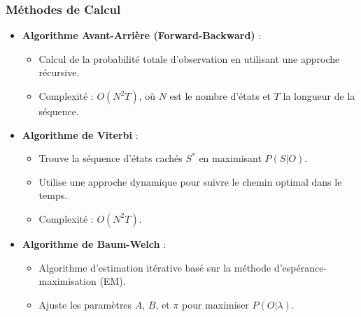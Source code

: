 \documentclass[a4paper,12pt,oneside]{report}	%
\begin{document}
            \subsubsection{Méthodes de Calcul}
                \begin{itemize}
                    \item \textbf{Algorithme Avant-Arrière (Forward-Backward)} :
                        \begin{itemize}
                            \item Calcul de la probabilité totale d’observation en utilisant une approche récursive.
                            \item Complexité : $O(N^2T)$, où $N$ est le nombre d’états et $T$ la longueur de la séquence.
                        \end{itemize}
                    \item \textbf{Algorithme de Viterbi} :
                        \begin{itemize}
                            \item Trouve la séquence d’états cachés $S^*$ en maximisant $P(S | O)$.
                            \item Utilise une approche dynamique pour suivre le chemin optimal dans le temps.
                            \item Complexité : $O(N^2T)$.
                        \end{itemize}
                    \item \textbf{Algorithme de Baum-Welch} :
                        \begin{itemize}
                            \item Algorithme d’estimation itérative basé sur la méthode d’espérance-maximisation (EM).
                            \item Ajuste les paramètres $A$, $B$, et $\pi$ pour maximiser $P(O | \lambda)$.
                        \end{itemize}
                \end{itemize}
\end{document}
